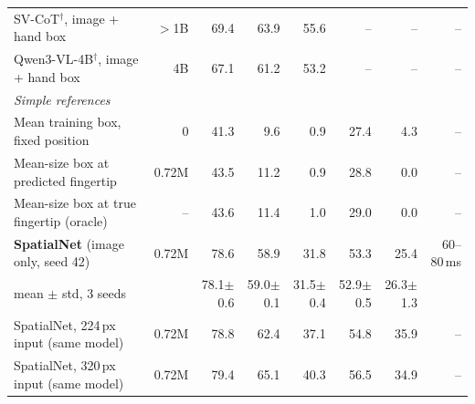 \begin{table}[t]
\begin{tabular}{lrrrrrrr}
    \quad SV-CoT$^\dagger$, image + hand box & $>$1B & 69.4 & 63.9 & 55.6 & -- & -- & -- \\
    \quad Qwen3-VL-4B$^\dagger$, image + hand box & 4B & 67.1 & 61.2 & 53.2 & -- & -- & -- \\
    \multicolumn{8}{l}{\emph{Simple references}} \\
    \quad Mean training box, fixed position & 0 & 41.3 & 9.6 & 0.9 & 27.4 & 4.3 & -- \\
    \quad Mean-size box at predicted fingertip & 0.72M & 43.5 & 11.2 & 0.9 & 28.8 & 0.0 & -- \\
    \quad Mean-size box at true fingertip (oracle) & -- & 43.6 & 11.4 & 1.0 & 29.0 & 0.0 & -- \\
    \midrule
    \textbf{SpatialNet} (image only, seed 42) & 0.72M & 78.6 & 58.9 & 31.8 & 53.3 & 25.4 & 60--80\,ms \\
    \quad mean $\pm$ std, 3 seeds & & 78.1{\scriptsize$\pm$0.6} & 59.0{\scriptsize$\pm$0.1} & 31.5{\scriptsize$\pm$0.4} & 52.9{\scriptsize$\pm$0.5} & 26.3{\scriptsize$\pm$1.3} & \\
    SpatialNet, 224\,px input (same model) & 0.72M & 78.8 & 62.4 & 37.1 & 54.8 & 35.9 & -- \\
    SpatialNet, 320\,px input (same model) & 0.72M & 79.4 & 65.1 & 40.3 & 56.5 & 34.9 & -- \\
    \bottomrule
  \end{tabular}
\end{table}

